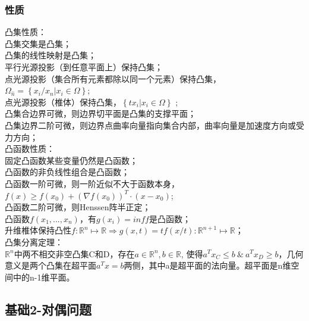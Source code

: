\documentclass[UTF8]{../computerUniverse}
\begin{document}
\subsubsection{性质}
凸集性质：\\
凸集交集是凸集；\\
凸集的线性映射是凸集；\\
平行光源投影（到任意平面上）保持凸集；\\
点光源投影（集合所有元素都除以同一个元素）保持凸集，
$\Omega _{\hat{n}}=\left\{ x_i/x_n |x_i\in \Omega \right \} $;\\
点光源投影（椎体）保持凸集，$\left\{ tx_i |x_i\in \Omega \right\}$ ;\\
凸集合边界可微，则边界切平面是凸集的支撑平面；\\
凸集边界二阶可微，则边界点曲率向量指向集合内部，曲率向量是加速度方向或受力方向；\\

凸函数性质：\\
固定凸函数某些变量仍然是凸函数；\\
凸函数的非负线性组合是凸函数；\\ 
凸函数一阶可微，则一阶近似不大于函数本身，
$f(x)\geqslant f(x_0)+\left( \nabla f(x_0) \right)^T \cdot (x-x_0)$;\\
凸函数二阶可微，则Henssen阵半正定；\\
凸函数$f(x_1,...,x_n)$，有$g(x_i)=inf f$是凸函数；\\
升维椎体保持凸性$f:\mathbb{R}^n \mapsto \mathbb{R} \Rightarrow 
g(x,t)=tf(x/t): \mathbb{R}^{n+1} \mapsto \mathbb{R} $；\\

凸集分离定理：\\
$\mathbb{{R}}^n$中两不相交非空凸集C和D，存在$a \in \mathbb{R}^n, b \in \mathbb{R}$, 使得$a^Tx_C \leqslant b\ \&\ a^Tx_D \geqslant b$，几何意义是两个凸集在超平面$a^Tx=b$两侧，其中a是超平面的法向量。超平面是n维空间中的n-1维平面。\\

\subsection{基础2-对偶问题}
\end{document}
